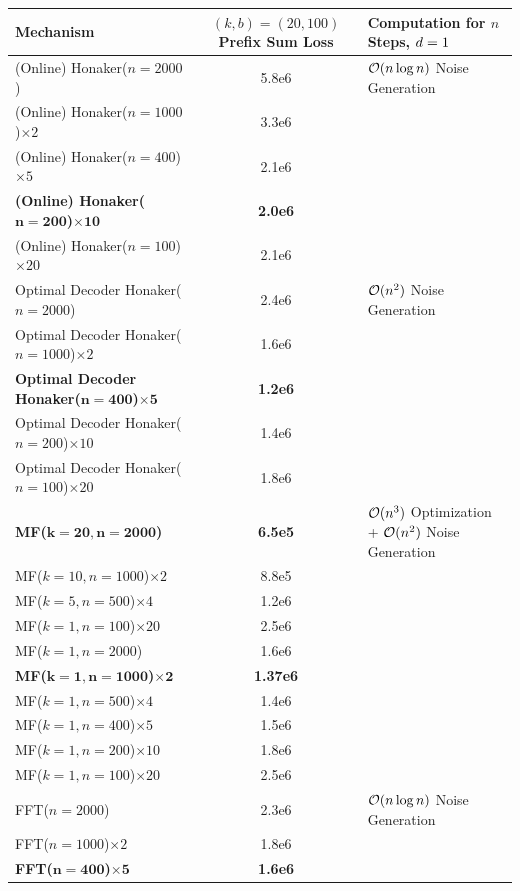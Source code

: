 \documentclass{article} %
\theoremstyle{named}
\begin{document}
\begin{table}[h!]
\begin{center}
\begin{tabular}{lcl}
\toprule
Mechanism & \makecell{$(k,b)=(20,100)$\\Prefix Sum Loss} & Computation for $n$ Steps, $d=1$\\
\midrule
(Online) Honaker($n=2000$) & 5.8e6 & $\mathcal{O}(n\log{n})$ Noise Generation\\
(Online) Honaker($n=1000$)$\times2$ & 3.3e6 & \\
(Online) Honaker($n=400$)$\times5$ & 2.1e6 & \\
\textbf{(Online) Honaker($\mathbf{n=200}$)$\mathbf{\times10}$} & \textbf{2.0e6} & \\
(Online) Honaker($n=100$)$\times20$ & 2.1e6 & \\
\midrule
Optimal Decoder Honaker($n=2000$) & 2.4e6 & $\mathcal{O}(n^2)$ Noise Generation\\
Optimal Decoder Honaker($n=1000$)$\times2$ & 1.6e6 & \\
\textbf{Optimal Decoder Honaker($\mathbf{n=400}$)$\mathbf{\times5}$} & \textbf{1.2e6} & \\
Optimal Decoder Honaker($n=200$)$\times10$ & 1.4e6 & \\
Optimal Decoder Honaker($n=100$)$\times20$ & 1.8e6 & \\
\midrule
\textbf{MF($\mathbf{k=20,n=2000}$)} & \textbf{6.5e5} & \makecell{$\calO(n^3)$ Optimization +\\$\mathcal{O}(n^2)$ Noise Generation}\\
MF($k=10,n=1000$)$\times2$ & 8.8e5 & \\
MF($k=5,n=500$)$\times4$ & 1.2e6 & \\
MF($k=1,n=100$)$\times20$ & 2.5e6 & \\
MF($k=1,n=2000$) & 1.6e6 & \\
\textbf{MF($\mathbf{k=1,n=1000}$)$\mathbf{\times2}$} & \textbf{1.37e6} & \\
MF($k=1,n=500$)$\times4$ & 1.4e6 & \\
MF($k=1,n=400$)$\times5$ & 1.5e6 & \\
MF($k=1,n=200$)$\times10$ & 1.8e6 & \\
MF($k=1,n=100$)$\times20$ & 2.5e6 & \\
\midrule
FFT($n=2000$) & 2.3e6 & $\mathcal{O}(n\log{n})$ Noise Generation\\
FFT($n=1000$)$\times2$ & 1.8e6 & \\
\textbf{FFT($\mathbf{n=400}$)$\mathbf{\times5}$} & \textbf{1.6e6} & \\

\end{tabular}
\end{center}
\end{table}
\end{document}
